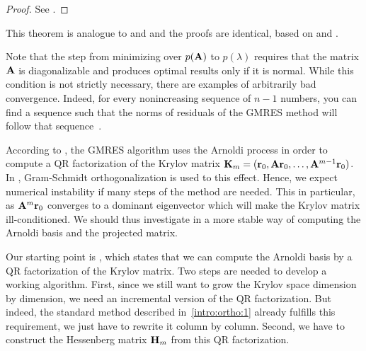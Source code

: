 \begin{proof}
  See \cite[Corollary 6.33]{Saad00}.
\end{proof}

\begin{remark}
  This theorem is analogue to  and
   and the proofs are
  identical, based on  and
  .

  Note that the step from minimizing over $p(\mathbf A)$ to $p(\lambda)$
  requires that the matrix $\mathbf A$ is diagonalizable and produces
  optimal results only if it is normal. While this condition is not
  strictly necessary, there are examples of arbitrarily bad
  convergence. Indeed, for every nonincreasing sequence of $n-1$
  numbers, you can find a sequence such that the norms of residuals of
  the GMRES method will follow that
  sequence~\cite{GreenbaumPtakStrakos96}.
\end{remark}

\begin{intro}
  According to , the GMRES
  algorithm uses the Arnoldi process in order to compute a QR
  factorization of the Krylov matrix
  $\mathbf K_m = (\mathbf r_0,\mathbf A\mathbf r_0,\dots,\mathbf A^{m-1}\mathbf r_0)$. In
  , Gram-Schmidt orthogonalization is
  used to this effect. Hence, we expect numerical instability if many
  steps of the method are needed. This in particular, as
  $\mathbf A^m\mathbf r_0$ converges to a dominant eigenvector which will make
  the Krylov matrix ill-conditioned. We should thus investigate in a
  more stable way of computing the Arnoldi basis and the projected
  matrix.

  Our starting point is , which
  states that we can compute the Arnoldi basis by a QR factorization
  of the Krylov matrix. Two steps are needed to develop a working
  algorithm. First, since we still want to grow the Krylov space
  dimension by dimension, we need an incremental version of the QR
  factorization. But indeed, the standard method described
  in~\ref{intro:ortho:1} already fulfills this requirement, we just
  have to rewrite it column by column. Second, we have to construct
  the Hessenberg matrix $\mathbf H_m$ from this QR factorization.
\end{intro}

